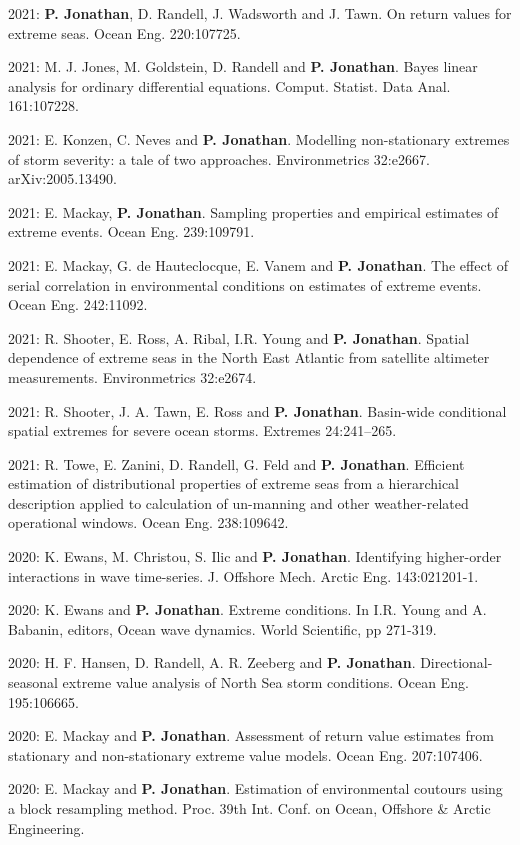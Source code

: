 \documentclass[11pt,a4paper]{moderncv}
\begin{document}
2021: \textbf{P. Jonathan}, D. Randell, J. Wadsworth and J. Tawn. On return values for extreme seas. Ocean Eng. 220:107725.

2021: M. J. Jones, M. Goldstein, D. Randell and \textbf{P. Jonathan}. Bayes linear analysis for ordinary differential equations. Comput. Statist. Data Anal. 161:107228.

2021: E. Konzen, C. Neves and \textbf{P. Jonathan}. Modelling non-stationary extremes of storm severity: a tale of two approaches. Environmetrics 32:e2667. arXiv:2005.13490.

2021: E. Mackay,  \textbf{P. Jonathan}. Sampling properties and empirical estimates of extreme events. Ocean Eng. 239:109791.

2021: E. Mackay, G. de Hauteclocque, E. Vanem and \textbf{P. Jonathan}. The effect of serial correlation in environmental conditions on estimates of extreme events. Ocean Eng. 242:11092.

2021: R. Shooter, E. Ross, A. Ribal, I.R. Young and \textbf{P. Jonathan}. Spatial dependence of extreme seas in the North East Atlantic from satellite altimeter measurements. Environmetrics 32:e2674.

2021: R. Shooter, J. A. Tawn, E. Ross  and \textbf{P. Jonathan}. Basin-wide conditional spatial extremes for severe ocean storms. Extremes 24:241--265.

2021: R. Towe, E. Zanini, D. Randell, G. Feld and \textbf{P. Jonathan}. Efficient estimation of distributional properties of extreme seas from a hierarchical description applied to calculation of un-manning and other weather-related operational windows. Ocean Eng. 238:109642.

2020: K. Ewans, M. Christou, S. Ilic and \textbf{P. Jonathan}. Identifying higher-order interactions in wave time-series. J. Offshore Mech. Arctic Eng. 143:021201-1.

2020: K. Ewans and \textbf{P. Jonathan}. Extreme conditions. In I.R. Young and A. Babanin, editors, Ocean wave dynamics. World Scientific, pp 271-319.

2020: H. F. Hansen, D. Randell, A. R. Zeeberg and \textbf{P. Jonathan}. Directional-seasonal extreme value analysis of North Sea storm conditions. Ocean Eng. 195:106665. 

2020: E. Mackay and \textbf{P. Jonathan}. Assessment of return value estimates from stationary and non-stationary extreme value models. Ocean Eng. 207:107406.

2020: E. Mackay and \textbf{P. Jonathan}. Estimation of environmental coutours using a block resampling method. Proc. 39th Int. Conf. on Ocean, Offshore \& Arctic Engineering.
\end{document}
